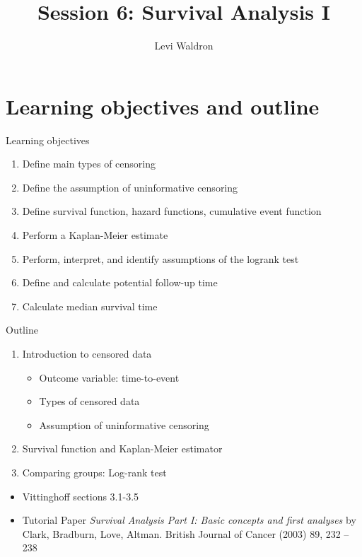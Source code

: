 \documentclass[
  ignorenonframetext,
]{beamer}
\title{Session 6: Survival Analysis I}
\author{Levi Waldron}
\date{}
\institute{CUNY SPH Biostatistics 2}
\providecommand{\tightlist}{%
  \setlength{\itemsep}{0pt}\setlength{\parskip}{0pt}}
\begin{document}
\frame{\titlepage}

\hypertarget{learning-objectives-and-outline}{%
\section{Learning objectives and
outline}\label{learning-objectives-and-outline}}

\begin{frame}{Learning objectives}
\protect\hypertarget{learning-objectives}{}

\begin{enumerate}
\tightlist
\item
  Define main types of censoring
\item
  Define the assumption of uninformative censoring
\item
  Define survival function, hazard functions, cumulative event function
\item
  Perform a Kaplan-Meier estimate
\item
  Perform, interpret, and identify assumptions of the logrank test
\item
  Define and calculate potential follow-up time
\item
  Calculate median survival time
\end{enumerate}

\end{frame}

\begin{frame}{Outline}
\protect\hypertarget{outline}{}

\begin{enumerate}
\tightlist
\item
  Introduction to censored data

  \begin{itemize}
  \tightlist
  \item
    Outcome variable: time-to-event
  \item
    Types of censored data
  \item
    Assumption of uninformative censoring
  \end{itemize}
\item
  Survival function and Kaplan-Meier estimator
\item
  Comparing groups: Log-rank test
\end{enumerate}

\begin{itemize}
\tightlist
\item
  Vittinghoff sections 3.1-3.5
\item
  Tutorial Paper \emph{Survival Analysis Part I: Basic concepts and
  first analyses} by Clark, Bradburn, Love, Altman. British Journal of
  Cancer (2003) 89, 232 -- 238
\end{itemize}

\end{frame}
\end{document}
